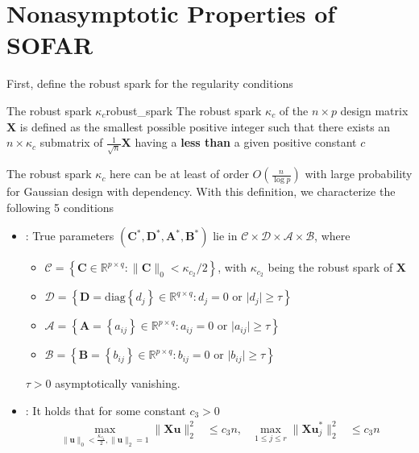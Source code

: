 \documentclass[twoside]{article}
\begin{document}
\section{Nonasymptotic Properties of SOFAR}
First, define the robust spark for the regularity conditions
\begin{definition}{The robust spark $\kappa_c$}{robust_spark}
    The robust spark $\kappa_c$ of the $n\times p$ design matrix $\mathbf{X}$ is defined as the smallest possible positive integer such that there exists an $n\times \kappa_c$ submatrix of $\frac{1}{\sqrt{n}}\mathbf{X}$ having a  \textbf{less than} a given positive constant $c$
\end{definition}
The robust spark $\kappa_c$ here can be at least of order $O\left( \frac{n}{\log p} \right)$ with large probability for Gaussian design with dependency. With this definition, we characterize the following 5 conditions
\begin{itemize}
    \item {}: True parameters $(\mathbf{C}^*,\mathbf{D}^*,\mathbf{A}^*,\mathbf{B}^*)$ lie in $\mathcal{C}\times \mathcal{D}\times \mathcal{A}\times \mathcal{B}$, where 
    \begin{itemize}
        \item $\mathcal{C} = \left\{ \mathbf{C}\in \mathbb{R}^{p\times q}: \lVert \mathbf{C} \rVert _0<\kappa_{c_2}/2 \right\}$, with $\kappa_{c_2}$ being the robust spark of $\mathbf{X}$
        \item $\mathcal{D} = \left\{ \mathbf{D} = \mathrm{diag}\left\{d_j\right\}\in \mathbb{R}^{q\times q}: d_j=0 \text{ or }\lvert d_j \rvert \geq \tau \right\}$
        \item $\mathcal{A} = \left\{ \mathbf{A}=\left\{a_{ij}\right\}\in\mathbb{R}^{p\times q}:a_{ij}=0\text{ or }\lvert a_{ij} \rvert \geq \tau  \right\}$
        \item $\mathcal{B} = \left\{ \mathbf{B}=\left\{b_{ij}\right\}\in\mathbb{R}^{p\times q}:b_{ij}=0\text{ or }\lvert b_{ij} \rvert \geq \tau  \right\}$
    \end{itemize}
    $\tau >0$ asymptotically vanishing.
    \item {}: It holds that for some constant $c_3 >0$
    \begin{align*}
        \max_{\lVert \mathbf{u} \rVert _0 <\frac{\kappa_{c_2}}{2}, \lVert \mathbf{u}\rVert _2=1}\lVert \mathbf{Xu}\rVert ^2_2 &\leq c_3 n, & \max_{1\leq j\leq r}\lVert \mathbf{Xu}^*_j\rVert ^2_2 &\leq c_3 n
    \end{align*}
\end{itemize}

%
%
\end{document}
